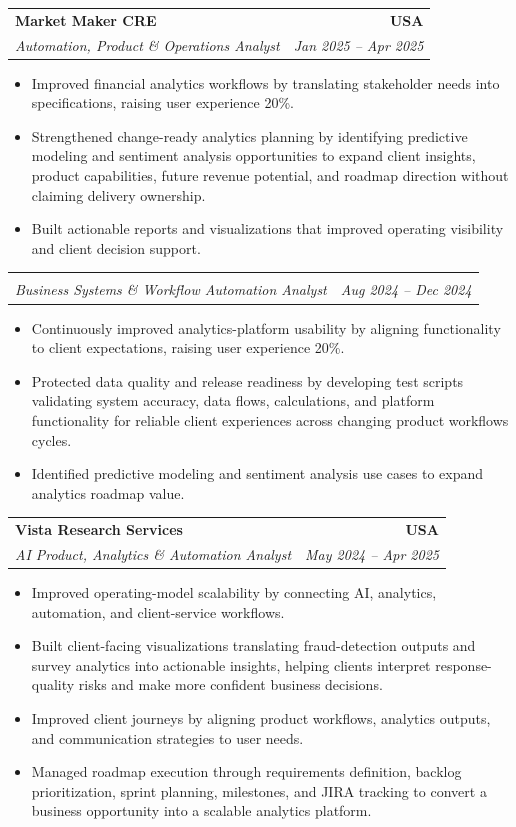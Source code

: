 \documentclass[letterpaper,10pt]{article}
\makeatletter
\newcommand{\resumeItem}[1]{\item \small{#1}}
\newcommand{\resumeSubheading}[4]{
  \vspace{1pt}\item
    \begin{tabular*}{1.0\textwidth}[t]{l@{\extracolsep{\fill}}r}
      \textbf{#1} & \textbf{\small #2} \\
      \textit{\small #3} & \textit{\small #4} \\
    \end{tabular*}\vspace{-6pt}
}
\newcommand{\resumeItemListStart}{\begin{itemize}[leftmargin=0.15in, itemsep=1pt, topsep=3pt]}
\newcommand{\resumeItemListEnd}{\end{itemize}\vspace{-2pt}}
\makeatother
\begin{document}
\vspace{-2pt}

\resumeSubheading
{Market Maker CRE}{USA}
{Automation, Product \& Operations Analyst}{Jan 2025 -- Apr 2025}
\resumeItemListStart
\resumeItem{Improved financial analytics workflows by translating stakeholder needs into specifications, raising user experience 20\%.}
\resumeItem{Strengthened change-ready analytics planning by identifying predictive modeling and sentiment analysis opportunities to expand client insights, product capabilities, future revenue potential, and roadmap direction without claiming delivery ownership.}
\resumeItem{Built actionable reports and visualizations that improved operating visibility and client decision support.}
\resumeItemListEnd

\vspace{-12pt}

\resumeSubheading
{}{}
{Business Systems \& Workflow Automation Analyst}{Aug 2024 -- Dec 2024}
\resumeItemListStart
\resumeItem{Continuously improved analytics-platform usability by aligning functionality to client expectations, raising user experience 20\%.}
\resumeItem{Protected data quality and release readiness by developing test scripts validating system accuracy, data flows, calculations, and platform functionality for reliable client experiences across changing product workflows cycles.}
\resumeItem{Identified predictive modeling and sentiment analysis use cases to expand analytics roadmap value.}
\resumeItemListEnd

\vspace{-2pt}

\resumeSubheading
{Vista Research Services}{USA}
{AI Product, Analytics \& Automation Analyst}{May 2024 -- Apr 2025}
\resumeItemListStart
\resumeItem{Improved operating-model scalability by connecting AI, analytics, automation, and client-service workflows.}
\resumeItem{Built client-facing visualizations translating fraud-detection outputs and survey analytics into actionable insights, helping clients interpret response-quality risks and make more confident business decisions.}
\resumeItem{Improved client journeys by aligning product workflows, analytics outputs, and communication strategies to user needs.}
\resumeItem{Managed roadmap execution through requirements definition, backlog prioritization, sprint planning, milestones, and JIRA tracking to convert a business opportunity into a scalable analytics platform.}
\resumeItemListEnd

\vspace{-2pt}
\end{document}
